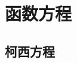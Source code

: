 
\section{函数方程}
\label{sec:function-equation}

\subsection{柯西方程}
\label{sec:cauchy-function-equality}


